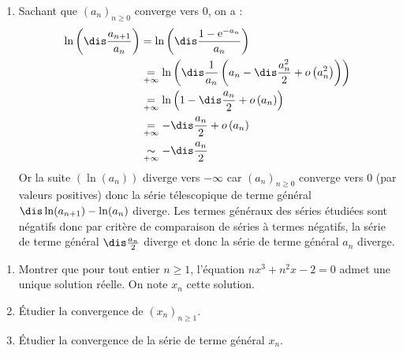 \documentclass[a4paper,10pt]{report}
\begin{document}
\begin{enumerate}
\item  Sachant que $(a_n)_{n \geq 0}$ converge vers $0$, on a :
\begin{align*}
\ln \left( {\dis\frac{{a_{n + 1} }}{{a_n }}} \right) & =  \ln \left( {\dis\frac{1 - {\mathrm{e}}^{ - a_n }}{{a_n }}} \right) \\
&  \underset{+ \infty}{=}  \ln \left( \dis\frac{1}{a_n}\left(a_n-\dis\frac{a_n^2}{2}+ o\left(a_n^2\right)\right) \right)\\
& \underset{+ \infty}{=}  	\ln \left(1-\dis\frac{a_n}{2}+ o\left(a_n\right) \right) \\
& \underset{+ \infty}{=} -\dis\frac{a_n}{2}+ o\left(a_n\right) \\
& \underset{+ \infty}{\sim} -\dis\frac{a_n}{2} \\
\end{align*}
Or la suite $(\ln(a_n))$ diverge vers $-\infty$ car $(a_n)_{n \geq 0}$ converge vers $0$ (par valeurs positives) donc la s\'erie t\'elescopique de terme général $\dis \ln(a_{n+1})-\ln(a_n)$ diverge. Les termes g\'en\'eraux des s\'eries étudiées sont n\'egatifs donc par critère de comparaison de séries à termes négatifs, la série de terme général $ \dis\frac{a_n}{2}$ diverge et donc la s\'erie de terme général $a_n$ diverge.
\end{enumerate}

\medskip


\begin{Exa} 
\begin{enumerate}
\item Montrer que pour tout entier $n \geq 1$, l'équation $nx^3+n^2x-2=0$ admet une unique solution réelle. On note $x_n$ cette solution.
\item Étudier la convergence de $(x_n)_{n \geq 1}$.
\item Étudier la convergence de la série de terme général $x_n$.
\end{enumerate}
\end{Exa}

\corr 
\end{document}
